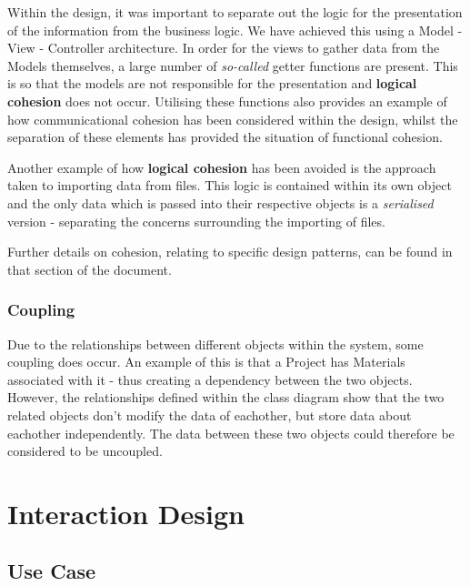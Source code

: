 \documentclass[
  english,
  a4paper,
,tablecaptionabove
]{scrartcl}
\begin{document}
Within the design, it was important to separate out the logic for the
presentation of the information from the business logic. We have
achieved this using a Model - View - Controller architecture. In order
for the views to gather data from the Models themselves, a large number
of \emph{so-called} getter functions are present. This is so that the
models are not responsible for the presentation and \textbf{logical
cohesion} does not occur. Utilising these functions also provides an
example of how communicational cohesion has been considered within the
design, whilst the separation of these elements has provided the
situation of functional cohesion.

Another example of how \textbf{logical cohesion} has been avoided is the
approach taken to importing data from files. This logic is contained
within its own object and the only data which is passed into their
respective objects is a \emph{serialised} version - separating the
concerns surrounding the importing of files.

Further details on cohesion, relating to specific design patterns, can
be found in that section of the document.

\hypertarget{coupling}{%
\subsubsection{Coupling}\label{coupling}}

Due to the relationships between different objects within the system,
some coupling does occur. An example of this is that a Project has
Materials associated with it - thus creating a dependency between the
two objects. However, the relationships defined within the class diagram
show that the two related objects don't modify the data of eachother,
but store data about eachother independently. The data between these two
objects could therefore be considered to be uncoupled.

\newpage

\hypertarget{interaction-design}{%
\section{Interaction Design}\label{interaction-design}}

\hypertarget{use-case}{%
\subsection{Use Case}\label{use-case}}
\end{document}
